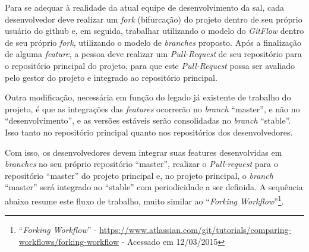 Para se adequar à realidade da atual equipe de desenvolvimento da \gls{sal}, cada desenvolvedor deve realizar um \textit{fork} (bifurcação) do projeto dentro de seu próprio usuário do github e, em seguida, trabalhar utilizando o modelo do \textit{GitFlow} dentro de seu próprio \textit{fork}, utilizando o modelo de \textit{branches} proposto. Após a finalização de alguma \textit{feature}, a pessoa deve realizar um \textit{Pull-Request} de seu repositório para o repositório principal do projeto, para que este \textit{Pull-Request} possa ser avaliado pelo gestor do projeto e integrado ao repositório principal.

Outra modificação, necessária em função do legado já existente de trabalho do projeto, é que as integrações das \textit{features} ocorrerão no \textit{branch} ``master'', e não no ``desenvolvimento'', e as versões estáveis serão consolidadas no \textit{branch} ``stable''. Isso tanto no repositório principal quanto nos repositórios dos desenvolvedores.

Com isso, os desenvolvedores devem integrar suas features desenvolvidas em \textit{branches} no seu próprio repositório ``master'', realizar o \textit{Pull-request} para o repositório ``master'' do projeto principal e, no projeto principal, o \textit{branch} ``master'' será integrado ao ``stable'' com periodicidade a ser definida. A sequência abaixo resume este fluxo de trabalho, muito similar ao ``\textit{Forking Workflow}''\footnote{``\textit{Forking Workflow}'' - \url{https://www.atlassian.com/git/tutorials/comparing-workflows/forking-workflow} - Acessado em 12/03/2015}.
\newpage
